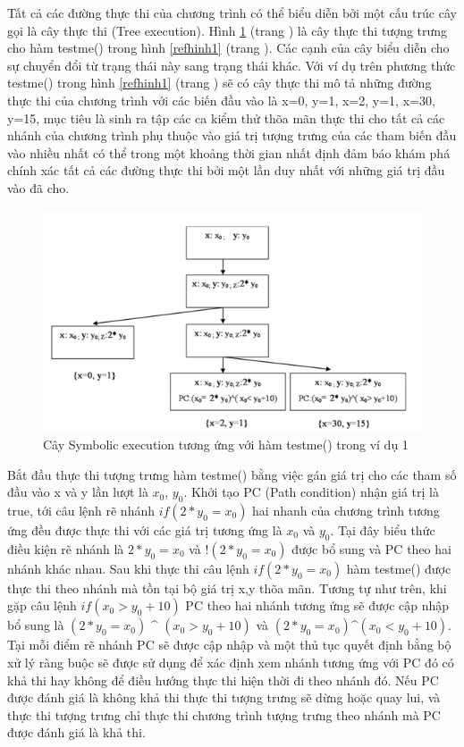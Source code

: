 \documentclass[12pt,a4paper]{article}
\begin{document}
\indent Tất cả các đường thực thi của chương trình có thể biểu diễn bởi một cấu trúc cây gọi là cây thực thi (Tree execution). Hình \ref{refhinh2} (trang \pageref{refhinh2}) là cây thực thi tượng trưng cho hàm testme() trong hình \ref{refhinh1} (trang \pageref{refhinh1}). Các cạnh của cây biểu diễn cho sự chuyển đổi từ trạng thái này sang trạng thái khác. Với ví dụ trên phương thức testme() trong hình \ref{refhinh1} (trang \pageref{refhinh1}) sẽ có cây thực thi mô tả những đường thực thi của chương trình với các biến đầu vào là {x=0, y=1}, {x=2, y=1}, {x=30, y=15}, mục tiêu là sinh ra tập các ca kiểm thử thõa mãn thực thi cho tất cả các nhánh của chương trình phụ thuộc vào giá trị tượng trưng của các tham biến đầu vào nhiều nhất có thể trong một khoảng thời gian nhất định đảm báo khám phá chính xác tất cả các đường thực thi bởi một lần duy nhất với những giá trị đầu vào đã cho.

\begin{figure}[ht]
\begin{center}
\includegraphics{hinhanh/hinh2}
\end{center}
\caption{Cây Symbolic execution tương ứng với hàm testme() trong ví dụ 1}
\label{refhinh2}
\end{figure}

\indent Bắt đầu thực thi tượng trưng hàm testme() bằng việc gán giá trị cho các tham số đầu vào x và y lần lượt là $x_0$, $y_0$. Khởi tạo PC (Path condition) nhận giá trị là true, tới câu lệnh rẽ nhánh $if(2*y_0=x_0)$ hai nhanh của chương trình tương ứng đều được thực thi với các giá trị tương ứng là $x_0$ và $y_0$. Tại đây biểu thức điều kiện rẽ nhánh là $2*y_0=x_0$ và $!(2*y_0=x_0)$ được bổ sung và PC theo hai nhánh khác nhau. Sau khi thực thi câu lệnh $if(2*y_0=x_0)$ hàm testme() được thực thi theo nhánh mà tồn tại bộ giá trị x,y thõa mãn. Tương tự như trên, khi gặp câu lệnh $if(x_0>y_0+10)$ PC theo hai nhánh tương ứng sẽ được cập nhập bổ sung là $(2*y_0=x_0)$ \^{} $(x_0>y_0+10)$ và $(2*y_0=x_0)$\^{}$(x_0<y_0+10)$. Tại mỗi điểm rẽ nhánh PC sẽ được cập nhập và một thủ tục quyết định bằng bộ xử lý ràng buộc sẽ được sử dụng để xác định xem nhánh tương ứng với PC đó có khả thi hay không để điều hướng thực thi hiện thời đi theo nhánh đó. Nếu PC được đánh giá là không khả thi thực thi tượng trưng sẽ dừng hoặc quay lui, và thực thi tượng trưng chỉ thực thi chương trình tượng trưng theo nhánh mà PC được đánh giá là khả thi.
\end{document}
